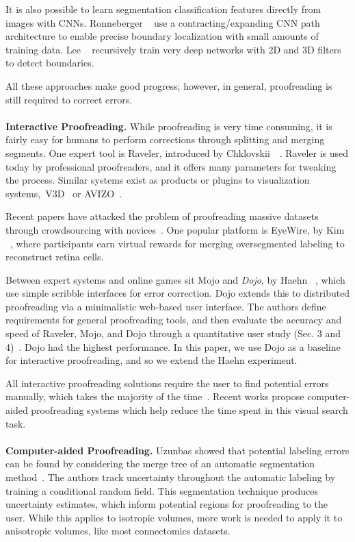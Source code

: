 It is also possible to learn segmentation classification features directly from images with CNNs. Ronneberger \etal~\cite{RonnebergerFB15} use a contracting/expanding CNN path architecture to enable precise boundary localization with small amounts of training data. Lee \etal~\cite{lee2015recursive} recursively train very deep networks with 2D and 3D filters to detect boundaries.

All these approaches make good progress; however, in general, proofreading is still required to correct errors.
\\~\\
\textbf{Interactive Proofreading.} While proofreading is very time consuming, it is fairly easy for humans to perform corrections through splitting and merging segments. One expert tool is Raveler, introduced by Chklovskii~\etal~\cite{chklovskii2010, raveler}. Raveler is used today by professional proofreaders, and it offers many parameters for tweaking the process. Similar systems exist as products or plugins to visualization systems,~\eg V3D~\cite{proofreading_bottleneck} or AVIZO~\cite{markus_proofreading}. 

Recent papers have attacked the problem of proofreading massive datasets through crowdsourcing with novices~\cite{saalfeld09,anderson2011,Giuly2013DP2}. One popular platform is EyeWire, by Kim \etal~\cite{eyewire_nature}, where participants earn virtual rewards for merging oversegmented labeling to reconstruct retina cells.

Between expert systems and online games sit Mojo and \textit{Dojo}, by Haehn \etal~\cite{haehn_dojo_2014,Neuroblocks}, which use simple scribble interfaces for error correction. Dojo extends this to distributed proofreading via a minimalistic web-based user interface. The authors define requirements for general proofreading tools, and then evaluate the accuracy and speed of Raveler, Mojo, and Dojo through a quantitative user study (Sec. 3 and 4)~\cite{haehn_dojo_2014}. Dojo had the highest performance. In this paper, we use Dojo as a baseline for interactive proofreading, and so we extend the Haehn \etal experiment.

All interactive proofreading solutions require the user to find potential errors manually, which takes the majority of the time~\cite{proofreading_bottleneck,haehn_dojo_2014}. Recent works propose computer-aided proofreading systems which help reduce the time spent in this visual search task.
\\~\\
\textbf{Computer-aided Proofreading.} Uzunbas \etal showed that potential labeling errors can be found by considering the merge tree of an automatic segmentation method~\cite{uzunbas}. The authors track uncertainty throughout the automatic labeling by training a conditional random field. This segmentation technique produces uncertainty estimates, which inform potential regions for proofreading to the user. While this applies to isotropic volumes, more work is needed to apply it to anisotropic volumes, like most connectomics datasets.

